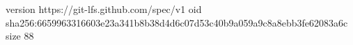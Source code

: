 version https://git-lfs.github.com/spec/v1
oid sha256:6659963316603e23a341b8b38d4d6c07d53c40b9a059a9c8a8ebb3fe62083a6c
size 88
